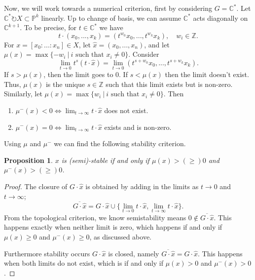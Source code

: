 \documentclass{article}
\newtheorem{prop}[theorem]{Proposition}
\theoremstyle{definition}
\theoremstyle{remark}
\numberwithin{theorem}{section}
\newcommand{\C}{\mathbb{C}}
\newcommand{\bP}{\mathbb{P}}
\begin{document}
	Now, we will work towards a numerical criterion, first by considering $G=\C^\ast$. Let $\C^\ast\circlearrowright X\subset\bP^k$ linearly. Up to change of basis, we can assume $\C^\ast$ acts diagonally on $\C^{k+1}$. To be precise, for $t\in\C^\ast$ we have
	\begin{equation}
		t\cdot(x_0,...,x_{k}) = (t^{w_0}x_0,...,t^{w_k}x_k),\quad w_i\in\mathbb{Z}.
	\end{equation}
	For $x=[x_0:...:x_n]\in X$, let $\hat{x}=(x_0,...,x_n)$, and let $\mu(x)=\max\{-w_i~|~i \text{ such that } x_i\neq 0\}$. Consider
	\begin{equation}
		\lim_{t\to 0} t^s (t\cdot \hat{x}) = \lim_{t\to 0} (t^{s+w_0}x_0,...,t^{s+w_k}x_k).
	\end{equation}
	If $s>\mu(x)$, then the limit goes to 0. If $s<\mu(x)$ then the limit doesn't exist. Thus, $\mu(x)$ is the unique $s\in\mathbb{Z}$ such that this limit exists but is non-zero. Similarly, let $\mu(x)=\max\{w_i~|~i \text{ such that } x_i\neq 0\}$. Then
	\begin{enumerate}
		\item $\mu^-(x)<0 \iff \lim_{t\to\infty} t\cdot\hat{x}$ does not exist.
		\item $\mu^-(x)=0 \iff \lim_{t\to\infty} t\cdot\hat{x}$ exists and is non-zero.
	\end{enumerate}
	Using $\mu$ and $\mu^-$ we can find the following stability criterion.
	\begin{prop}
	$x$ is (semi)-stable if and only if $\mu(x)>(\geq)0$ and $\mu^-(x)>(\geq)0$.
	\end{prop}
	\begin{proof}
		The closure of $G\cdot \hat{x}$ is obtained by adding in the limits as $t\to0$ and $t\to\infty$;
		\begin{equation}
			\overline{G\cdot\hat{x}} = G\cdot\hat{x}\cup \{\lim_{t\to 0} t\cdot \hat{x}, \lim_{t\to\infty}t\cdot\hat{x}\}.
		\end{equation}
		From the topological criterion, we know semistability means $0\not\in\overline{G\cdot \hat{x}}$. This happens exactly when neither limit is zero, which happens if and only if $\mu(x)\geq0$ and $\mu^-(x)\geq 0$, as discussed above. \vspace{1em}
		
		Furthermore stability occurs $G\cdot\hat{x}$ is closed, namely $\overline{G\cdot \hat{x}}=G\cdot\hat{x}$. This happens when both limits do not exist, which is if and only if $\mu(x)>0$ and $\mu^-(x)>0$.
	\end{proof}
\end{document}
